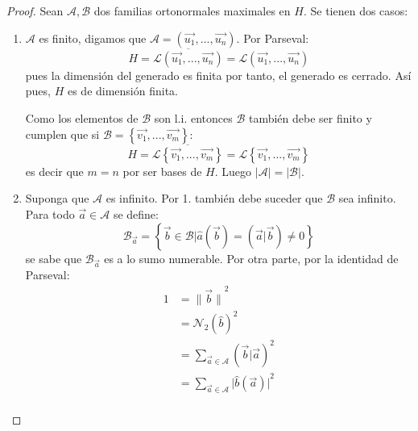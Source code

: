 \documentclass[12pt]{report}
\theoremstyle{largebreak}
\newcommand\abs[1]{\ensuremath{\big|#1\big|}}
\newcommand\norm[1]{\ensuremath{\|#1\|}}
\newcommand\pint[2]{\ensuremath{\left(#1\big| #2\right)}}
\newcommand{\N}[2]{\ensuremath{\mathcal{N}_{#1}\left(#2\right)}}
\begin{document}
    \begin{proof}
        Sean $\mathcal{A},\mathcal{B}$ dos familias ortonormales maximales en $H$. Se tienen dos casos:
        \begin{enumerate}
            \item $\mathcal{A}$ es finito, digamos que $\mathcal{A}=\left(\vec{u_1},...,\vec{u_n} \right)$. Por Parseval:
            \begin{equation*}
                H=\overline{\mathcal{L}(\vec{u_1},...,\vec{u_n})}=\mathcal{L}(\vec{u_1},...,\vec{u_n})
            \end{equation*}
            pues la dimensión del generado es finita por tanto, el generado es cerrado. Así pues, $H$ es de dimensión finita.
            
            Como los elementos de $\mathcal{B}$ son l.i. entonces $\mathcal{B}$ también debe ser finito y cumplen que si $\mathcal{B}=\left\{\vec{v_1},...,\vec{v_m} \right\}$:
            \begin{equation*}
                H=\overline{\mathcal{L}\left\{\vec{v_1},...,\vec{v_m} \right\}}=\mathcal{L}\left\{\vec{v_1},...,\vec{v_m} \right\}
            \end{equation*}
            es decir que $m=n$ por ser bases de $H$. Luego $\abs{\mathcal{A}}=\abs{\mathcal{B}}$.
            \item Suponga que $\mathcal{A}$ es infinito. Por 1. también debe suceder que $\mathcal{B}$ sea infinito. Para todo $\vec{a}\in\mathcal{A}$ se define:
            \begin{equation*}
                \mathcal{B}_{\vec{a}}=\left\{\vec{b}\in\mathcal{B}\Big|\hat{a}\left(\vec{b}\right) =\pint{\vec{a}}{\vec{b}}\neq0 \right\}
            \end{equation*}
            se sabe que $\mathcal{B}_{\vec{a}}$ es a lo sumo numerable. Por otra parte, por la identidad de Parseval:
            \begin{equation*}
                \begin{split}
                    1&=\norm{\vec{b}}^2\\
                    &=\N{2}{\hat{b}}^2\\
                    &=\sum_{\vec{a}\in\mathcal{A}}\pint{\vec{b}}{\vec{a}}^2\\
                    &=\sum_{\vec{a}\in\mathcal{A}}\abs{\hat{b}(\vec{a})}^2\\
                \end{split}
            \end{equation*}

\end{enumerate}
\end{proof}
\end{document}
